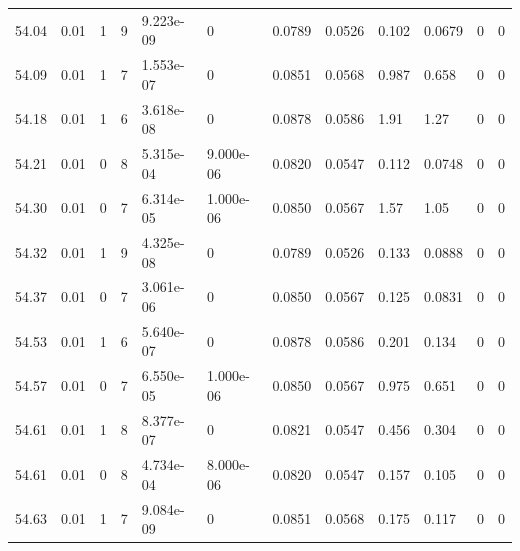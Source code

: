 \documentclass[preview]{standalone}
\begin{document}
{{{{{{{{{{{{{{\begin{tabular}{L{1.2cm}C{1.2cm} C{0.3cm}C{0.5cm} C{1.4cm}C{1.4cm} C{1.4cm}C{1.4cm} C{1.6cm}C{1.6cm} C{1.6cm}C{1.6cm}}
  54.04  &  0.01  & 1     &  9 &  9.223e-09  & 0  &  0.0789&   0.0526& 0.102 & 0.0679   &  0 & 0  \\ 
  54.09  &  0.01  & 1     &  7 &  1.553e-07  & 0  &  0.0851&   0.0568& 0.987 & 0.658   &  0 & 0  \\ 
  54.18  &  0.01  & 1     &  6 &  3.618e-08  & 0  &  0.0878&   0.0586& 1.91 & 1.27   &  0 & 0  \\ 
  54.21  &  0.01  & 0     &  8 &  5.315e-04  & 9.000e-06  &  0.0820&   0.0547& 0.112 & 0.0748   &  0 & 0  \\ 
  54.30  &  0.01  & 0     &  7 &  6.314e-05  & 1.000e-06  &  0.0850&   0.0567& 1.57 & 1.05   &  0 & 0  \\ 
  54.32  &  0.01  & 1     &  9 &  4.325e-08  & 0  &  0.0789&   0.0526& 0.133 & 0.0888   &  0 & 0  \\ 
  54.37  &  0.01  & 0     &  7 &  3.061e-06  & 0  &  0.0850&   0.0567& 0.125 & 0.0831   &  0 & 0  \\ 
  54.53  &  0.01  & 1     &  6 &  5.640e-07  & 0  &  0.0878&   0.0586& 0.201 & 0.134   &  0 & 0  \\ 
  54.57  &  0.01  & 0     &  7 &  6.550e-05  & 1.000e-06  &  0.0850&   0.0567& 0.975 & 0.651   &  0 & 0  \\ 
  54.61  &  0.01  & 1     &  8 &  8.377e-07  & 0  &  0.0821&   0.0547& 0.456 & 0.304   &  0 & 0  \\ 
  54.61  &  0.01  & 0     &  8 &  4.734e-04  & 8.000e-06  &  0.0820&   0.0547& 0.157 & 0.105   &  0 & 0  \\ 
  54.63  &  0.01  & 1     &  7 &  9.084e-09  & 0  &  0.0851&   0.0568& 0.175 & 0.117   &  0 & 0  \\ 
\hline 
\end{tabular} 

}}}}}}}}}}}}}}
\end{document}
